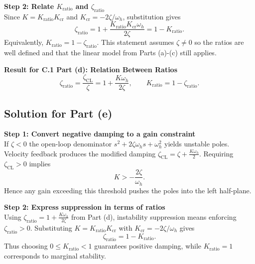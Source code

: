 \documentclass[12pt]{article}
\begin{document}
\begin{stepbox}
\textbf{Step 2: Relate $K_{\text{ratio}}$ and $\zeta_{\text{ratio}}$}\\[0.5em]
Since $K=K_{\text{ratio}}K_{\mathrm{cr}}$ and $K_{\mathrm{cr}}=-2\zeta/\omega_h$, substitution gives
\[
\zeta_{\text{ratio}} = 1 + \frac{K_{\text{ratio}}K_{\mathrm{cr}}\omega_h}{2\zeta}
= 1 - K_{\text{ratio}}.
\]
Equivalently, $K_{\text{ratio}} = 1 - \zeta_{\text{ratio}}$. This statement assumes $\zeta \neq 0$ so the ratios are well defined and that the linear model from Parts (a)-(c) still applies.
\end{stepbox}

\begin{resultsbox}
\textbf{Result for C.1 Part (d): Relation Between Ratios}\\[0.5em]
\[
\zeta_{\text{ratio}} = \frac{\zeta_{\text{CL}}}{\zeta} = 1 + \frac{K\omega_h}{2\zeta},
\qquad
K_{\text{ratio}} = 1 - \zeta_{\text{ratio}}.
\]
\end{resultsbox}

\clearpage
\subsection*{Solution for Part (e)}

\begin{stepbox}
\textbf{Step 1: Convert negative damping to a gain constraint}\\[0.5em]
If $\zeta < 0$ the open-loop denominator $s^2 + 2\zeta\omega_h s + \omega_h^2$ yields unstable poles. Velocity feedback produces the modified damping $\zeta_{\text{CL}} = \zeta + \tfrac{K\omega_h}{2}$. Requiring $\zeta_{\text{CL}} > 0$ implies
\[
K > -\frac{2\zeta}{\omega_h}.
\]
Hence any gain exceeding this threshold pushes the poles into the left half-plane.
\end{stepbox}

\begin{stepbox}
\textbf{Step 2: Express suppression in terms of ratios}\\[0.5em]
Using $\zeta_{\text{ratio}} = 1 + \tfrac{K\omega_h}{2\zeta}$ from Part (d), instability suppression means enforcing $\zeta_{\text{ratio}} > 0$. Substituting $K = K_{\text{ratio}}K_{\mathrm{cr}}$ with $K_{\mathrm{cr}} = -2\zeta/\omega_h$ gives
\[
\zeta_{\text{ratio}} = 1 - K_{\text{ratio}}.
\]
Thus choosing $0 \le K_{\text{ratio}} < 1$ guarantees positive damping, while $K_{\text{ratio}} = 1$ corresponds to marginal stability.
\end{stepbox}
\end{document}
